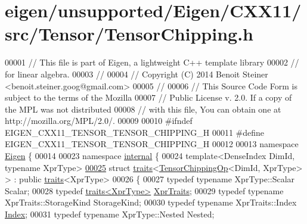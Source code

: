 \hypertarget{eigen_2unsupported_2_eigen_2_c_x_x11_2src_2_tensor_2_tensor_chipping_8h_source}{}\section{eigen/unsupported/\+Eigen/\+C\+X\+X11/src/\+Tensor/\+Tensor\+Chipping.h}
\label{eigen_2unsupported_2_eigen_2_c_x_x11_2src_2_tensor_2_tensor_chipping_8h_source}

\begin{DoxyCode}
00001 \textcolor{comment}{// This file is part of Eigen, a lightweight C++ template library}
00002 \textcolor{comment}{// for linear algebra.}
00003 \textcolor{comment}{//}
00004 \textcolor{comment}{// Copyright (C) 2014 Benoit Steiner <benoit.steiner.goog@gmail.com>}
00005 \textcolor{comment}{//}
00006 \textcolor{comment}{// This Source Code Form is subject to the terms of the Mozilla}
00007 \textcolor{comment}{// Public License v. 2.0. If a copy of the MPL was not distributed}
00008 \textcolor{comment}{// with this file, You can obtain one at http://mozilla.org/MPL/2.0/.}
00009 
00010 \textcolor{preprocessor}{#ifndef EIGEN\_CXX11\_TENSOR\_TENSOR\_CHIPPING\_H}
00011 \textcolor{preprocessor}{#define EIGEN\_CXX11\_TENSOR\_TENSOR\_CHIPPING\_H}
00012 
00013 \textcolor{keyword}{namespace }\hyperlink{namespace_eigen}{Eigen} \{
00014 
00023 \textcolor{keyword}{namespace }\hyperlink{namespaceinternal}{internal} \{
00024 \textcolor{keyword}{template}<DenseIndex DimId, \textcolor{keyword}{typename} XprType>
\hyperlink{struct_eigen_1_1internal_1_1traits_3_01_tensor_chipping_op_3_01_dim_id_00_01_xpr_type_01_4_01_4}{00025} \textcolor{keyword}{struct }\hyperlink{struct_eigen_1_1internal_1_1traits}{traits}<\hyperlink{class_eigen_1_1_tensor_chipping_op}{TensorChippingOp}<DimId, XprType> > : \textcolor{keyword}{public} 
      \hyperlink{struct_eigen_1_1internal_1_1traits}{traits}<XprType>
00026 \{
00027   \textcolor{keyword}{typedef} \textcolor{keyword}{typename} XprType::Scalar Scalar;
00028   \textcolor{keyword}{typedef} \hyperlink{struct_eigen_1_1internal_1_1traits}{traits<XprType>} \hyperlink{struct_eigen_1_1internal_1_1traits}{XprTraits};
00029   \textcolor{keyword}{typedef} \textcolor{keyword}{typename} XprTraits::StorageKind StorageKind;
00030   \textcolor{keyword}{typedef} \textcolor{keyword}{typename} XprTraits::Index \hyperlink{namespace_eigen_a62e77e0933482dafde8fe197d9a2cfde}{Index};
00031   \textcolor{keyword}{typedef} \textcolor{keyword}{typename} XprType::Nested Nested;

\end{DoxyCode}
